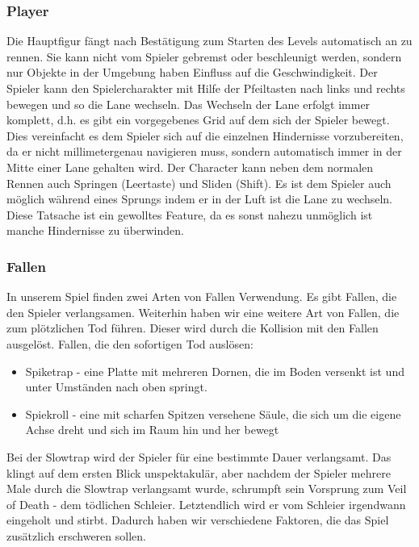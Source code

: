 \documentclass[10pt]{article}
\begin{document}
\vspace{0.5cm}
\subsubsection{Player}

Die Hauptfigur fängt nach Bestätigung zum Starten des Levels automatisch an zu rennen. Sie kann nicht vom Spieler gebremst oder beschleunigt werden, sondern nur Objekte in der Umgebung haben Einfluss auf die Geschwindigkeit.
Der Spieler kann den Spielercharakter mit Hilfe der Pfeiltasten nach links und rechts bewegen und so die Lane wechseln. Das Wechseln der Lane erfolgt immer komplett, d.h. es gibt ein vorgegebenes Grid auf dem sich der Spieler bewegt. Dies vereinfacht es dem Spieler sich auf die einzelnen Hindernisse vorzubereiten, da er nicht millimetergenau navigieren muss, sondern automatisch immer in der Mitte einer Lane gehalten wird. Der Character kann neben dem normalen Rennen auch Springen (Leertaste) und Sliden (Shift). Es ist dem Spieler auch möglich während eines Sprungs indem er in der Luft ist die Lane zu wechseln. Diese Tatsache ist ein gewolltes Feature, da es sonst nahezu unmöglich ist manche Hindernisse zu überwinden. 

\newpage
\vspace{0.5cm}
\subsubsection{Fallen}

In unserem Spiel finden zwei Arten von Fallen Verwendung. Es gibt Fallen, die den Spieler verlangsamen. Weiterhin haben wir eine
weitere Art von Fallen, die zum plötzlichen Tod führen. Dieser wird durch die Kollision mit den Fallen ausgelöst. Fallen, die den sofortigen Tod auslösen:
\begin{itemize}
	\item Spiketrap - eine Platte mit mehreren Dornen, die im Boden versenkt ist und unter Umständen nach oben springt.
	\item Spiekroll - eine mit scharfen Spitzen versehene Säule, die sich um die eigene Achse dreht und sich im Raum hin und her bewegt
\end{itemize}
Bei der Slowtrap wird der Spieler für eine bestimmte Dauer verlangsamt. Das klingt auf dem ersten Blick unspektakulär, aber nachdem der Spieler
mehrere Male durch die Slowtrap verlangsamt wurde, schrumpft sein Vorsprung zum \glqq Veil of Death\grqq{} - dem tödlichen Schleier. Letztendlich wird er vom Schleier irgendwann eingeholt und stirbt. Dadurch haben wir verschiedene Faktoren, die das Spiel zusätzlich erschweren sollen.
\end{document}
